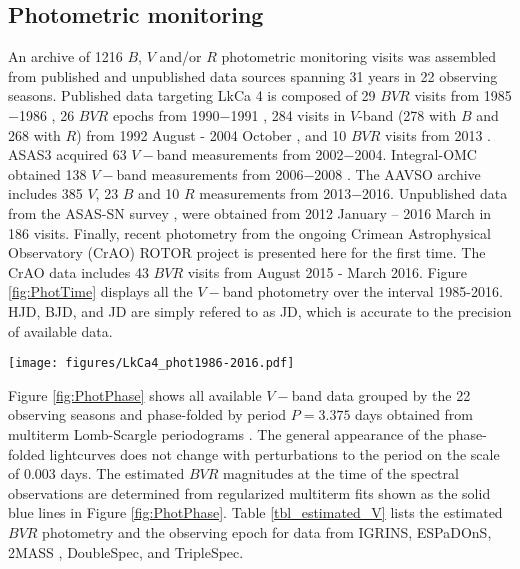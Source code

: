 \documentclass[twocolumn]{emulateapj}%
\newcommand{\name}{LkCa 4 }
\begin{document}
\subsection{Photometric monitoring}

An archive of 1216 $B$, $V$ and/or $R$ photometric monitoring visits was assembled from published and unpublished data sources spanning 31 years in 22 observing seasons.  Published data targeting \name is composed of 29 $BVR$ visits from 1985$-$1986 \citep{vrba93}, 26 $BVR$ epochs from 1990$-$1991 \citep{bouvier93}, 284 visits in $V$-band (278 with $B$ and 268 with $R$) from 1992 August - 2004 October \citep{grankin08}, and 10 $BVR$ visits from 2013 \citep{donati14}.  ASAS3 \citep{pojmanski04} acquired 63 $V-$band measurements from 2002$-$2004.  Integral-OMC obtained 138 $V-$band measurements from 2006$-$2008 \citep{garzon12}.  The AAVSO archive \citep{kafka16} includes 385 $V$, 23 $B$ and 10 $R$ measurements from 2013$-$2016.  Unpublished data from the ASAS-SN survey \citep{shappee14}, were obtained from 2012 January -- 2016 March in 186 visits.  Finally, recent photometry from the ongoing Crimean Astrophysical Observatory (CrAO) ROTOR project \citep{grankin08} is presented here for the first time.  The CrAO data includes 43 $BVR$ visits from August 2015 - March 2016. Figure \ref{fig:PhotTime} displays all the $V-$band photometry over the interval 1985-2016.  HJD, BJD, and JD are simply refered to as JD, which is accurate to the precision of available data.


\begin{figure*}
	\centering
	\texttt{[image: figures/LkCa4\_phot1986-2016.pdf]}
	\caption{Overview of \name $V-$band photometric monitoring from 1986$-$2016.  The vertical lines denote the observing epochs of 2MASS, IGRINS, ESPaDOnS, DoubleSpec, and TripleSpec.  The near contemporaneous DoubleSpec and TripleSpec epochs lay on top of each other on this scale, as do the 12 ESPaDOnS epochs.  The abscissa range is equal to the current lifespan of the first author of this paper.}
	\label{fig:PhotTime}
\end{figure*}

Figure \ref{fig:PhotPhase} shows all available $V-$band data grouped by the 22 observing seasons and phase-folded by period $P=3.375$ days obtained from multiterm Lomb-Scargle periodograms \citep{ivezic14}.  The general appearance of the phase-folded lightcurves does not change with perturbations to the period on the scale of 0.003 days.  The estimated $BVR$ magnitudes at the time of the spectral observations are determined from regularized multiterm fits \citep{vanderplas15a} shown as the solid blue lines in Figure \ref{fig:PhotPhase}.  Table \ref{tbl_estimated_V} lists the estimated $BVR$ photometry and the observing epoch for data from IGRINS, ESPaDOnS, 2MASS \citep{skrutskie06}, DoubleSpec, and TripleSpec.  
\end{document}
